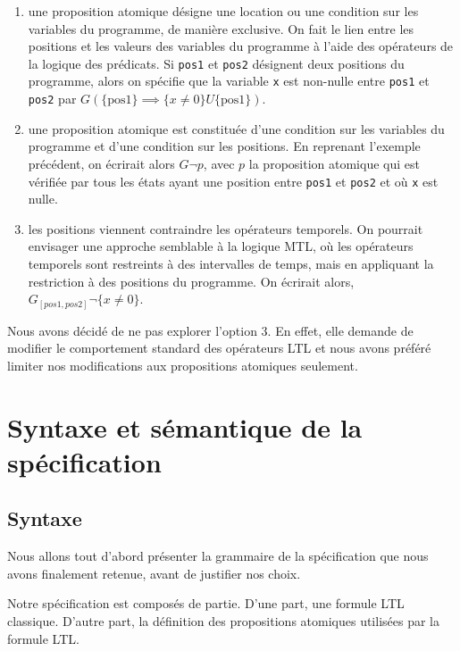 \begin{enumerate}
\def\labelenumi{\arabic{enumi})}
\item
  une proposition atomique désigne une location ou une condition sur les
  variables du programme, de manière exclusive. On fait le lien entre les
  positions et les valeurs des variables du programme à l'aide des opérateurs de
  la logique des prédicats. Si \texttt{pos1} et \texttt{pos2} désignent
  deux positions du programme, alors on spécifie que la variable \texttt{x}
  est non-nulle entre \texttt{pos1} et \texttt{pos2} par \(G
  (\{\text{pos1}\}\implies \{x \neq 0\} U \{\text{pos1}\})\).
\item
  une proposition atomique est constituée d'une condition sur les variables du
  programme et d'une condition sur les positions. En reprenant l'exemple
  précédent, on écrirait alors \(G \lnot p\), avec \(p\) la proposition atomique
  qui est vérifiée par tous les états ayant une position entre \texttt{pos1}
  et \texttt{pos2} et où \texttt{x} est nulle.
\item
  les positions viennent contraindre les opérateurs temporels. On pourrait
  envisager une approche semblable à la logique MTL\cite{mtl_definition}, où les
  opérateurs temporels sont restreints à des intervalles de temps, mais en
  appliquant la restriction à des positions du programme. On écrirait alors,
  \(G_{[pos1, pos2]} \lnot \{ x \neq 0 \}\).
\end{enumerate}

Nous avons décidé de ne pas explorer l'option 3. En effet, elle demande
de modifier le comportement standard des opérateurs LTL et nous avons
préféré limiter nos modifications aux propositions atomiques seulement.

\section{Syntaxe et sémantique de la spécification}

\subsection{Syntaxe}

Nous allons tout d'abord présenter la grammaire de la spécification que
nous avons finalement retenue, avant de justifier nos choix.

Notre spécification est composés de partie. D'une part, une formule LTL
classique. D'autre part, la définition des propositions atomiques utilisées
par la formule LTL.

